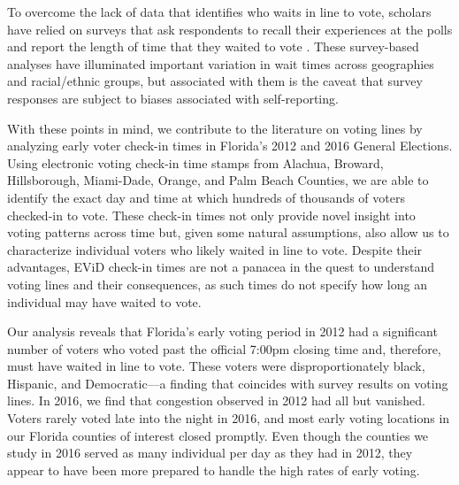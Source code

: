 \documentclass[12pt,titlepage]{article}
\begin{document}

To overcome the lack of data that identifies who waits in line to
vote, scholars have relied on surveys that ask respondents to recall
their experiences at the polls and report the length of time that they
waited to vote \citep{stewart:waitingtovote2012,
  pettigrew:racegapwaittimes}.  These survey-based analyses have
illuminated important variation in wait times across geographies and
racial/ethnic groups, but associated with them is the caveat that
survey responses are subject to biases associated with self-reporting.

With these points in mind, we contribute to the literature on voting
lines by analyzing early voter check-in times in Florida's 2012 and
2016 General Elections. Using electronic voting check-in time stamps
from Alachua, Broward, Hillsborough, Miami-Dade, Orange, and Palm
Beach Counties, we are able to identify the exact day and time at
which hundreds of thousands of voters checked-in to vote.  These
check-in times not only provide novel insight into voting patterns
across time but, given some natural assumptions, also allow us to
characterize individual voters who likely waited in line to
vote. Despite their advantages, EViD check-in times are not a panacea
in the quest to understand voting lines and their consequences, as
such times do not specify how long an individual may have waited to
vote.


Our analysis reveals that Florida's early voting period in 2012 had a
significant number of voters who voted past the official 7:00pm
closing time and, therefore, must have waited in line to vote.  These
voters were disproportionately black, Hispanic, and Democratic---a
finding that coincides with survey results on voting lines.  In 2016,
we find that congestion observed in 2012 had all but vanished.  Voters
rarely voted late into the night in 2016, and most early voting
locations in our Florida counties of interest closed promptly.  Even
though the counties we study in 2016 served as many individual per day
as they had in 2012, they appear to have been more prepared to handle
the high rates of early voting.
  
\end{document}
